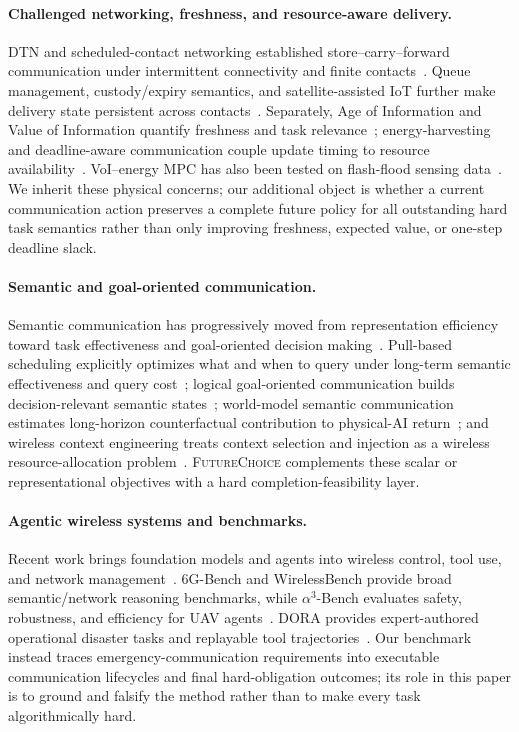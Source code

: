 \documentclass[conference]{IEEEtran}
\newcommand{\futurechoice}{\textsc{FutureChoice}\xspace}
\begin{document}
\paragraph{Challenged networking, freshness, and resource-aware delivery.}
DTN and scheduled-contact networking established store--carry--forward communication under intermittent connectivity and finite contacts~\cite{fall2003dtn,jain2004dtnrouting,rfc9171,ccsdssabr}. Queue management, custody/expiry semantics, and satellite-assisted IoT further make delivery state persistent across contacts~\cite{iranmaneshdtnqueue,sateriot}. Separately, Age of Information and Value of Information quantify freshness and task relevance~\cite{kaul2012aoi,yates2021aoisurvey,wang2021voi}; energy-harvesting and deadline-aware communication couple update timing to resource availability~\cite{bacinoglu1905,zakeri2311,costa2014pm,kam2016deadline}. VoI--energy MPC has also been tested on flash-flood sensing data~\cite{ahmad2025iotvoi}. We inherit these physical concerns; our additional object is whether a current communication action preserves a complete future policy for all outstanding hard task semantics rather than only improving freshness, expected value, or one-step deadline slack.

\paragraph{Semantic and goal-oriented communication.}
Semantic communication has progressively moved from representation efficiency toward task effectiveness and goal-oriented decision making~\cite{uysal2021semantic,guo2025semcomnet}. Pull-based scheduling explicitly optimizes what and when to query under long-term semantic effectiveness and query cost~\cite{agheli2025pull}; logical goal-oriented communication builds decision-relevant semantic states~\cite{saz2026logicalsemcom}; world-model semantic communication estimates long-horizon counterfactual contribution to physical-AI return~\cite{wang2026wmcdt}; and wireless context engineering treats context selection and injection as a wireless resource-allocation problem~\cite{zhao2026wirelesscontext}. \futurechoice complements these scalar or representational objectives with a hard completion-feasibility layer.

\paragraph{Agentic wireless systems and benchmarks.}
Recent work brings foundation models and agents into wireless control, tool use, and network management~\cite{liang2025llmwireless,lu2026wirelessops}. 6G-Bench and WirelessBench provide broad semantic/network reasoning benchmarks, while $\alpha^3$-Bench evaluates safety, robustness, and efficiency for UAV agents~\cite{ferrag2026sixgbench,tong2026wirelessbench,ferrag2026alpha3bench}. DORA provides expert-authored operational disaster tasks and replayable tool trajectories~\cite{dora2026}. Our benchmark instead traces emergency-communication requirements into executable communication lifecycles and final hard-obligation outcomes; its role in this paper is to ground and falsify the method rather than to make every task algorithmically hard.
\end{document}
